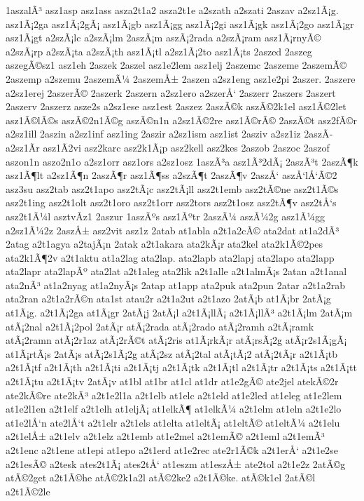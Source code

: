 {1aszalÃ³
asz1asp
asz1ass
asza2t1a2
asza2t1e
a2szath
a2szati
2aszav
a2sz1Ã¡g.
asz1Ã¡2ga
asz1Ã¡2gÃ¡
asz1Ã¡gb
asz1Ã¡gg
asz1Ã¡2gi
asz1Ã¡gk
asz1Ã¡2go
asz1Ã¡gr
asz1Ã¡gt
a2szÃ¡lc
a2szÃ¡lm
2aszÃ¡m
aszÃ¡2rada
a2szÃ¡ram
asz1Ã¡rnyÃ©
a2szÃ¡rp
a2szÃ¡ta
a2szÃ¡th
asz1Ã¡tl
a2sz1Ã¡2to
asz1Ã¡ts
2aszed
2aszeg
aszegÃ©sz1
asz1eh
2aszek
2aszel
asz1e2lem
asz1elj
2aszemc
2aszeme
2aszemÃ©
2aszemp
a2szemu
2aszemÃ¼
2aszemÅ±
2aszen
a2sz1eng
asz1e2pi
2aszer.
2aszere
a2sz1erej
2aszerÃ©
2aszerk
2aszern
a2sz1ero
a2szerÅ‘
2aszerr
2aszers
2aszert
2aszerv
2aszerz
asze2s
a2sz1ese
asz1est
2aszez
2aszÃ©k
aszÃ©2k1el
asz1Ã©2let
asz1Ã©lÃ©s
aszÃ©2n1Ã©g
aszÃ©n1n
a2sz1Ã©2re
asz1Ã©rÃ©
2aszÃ©t
asz2fÃ©r
a2sz1ill
2aszin
a2sz1inf
asz1ing
2aszir
a2sz1ism
asz1ist
2asziv
a2sz1iz
2aszÃ­
a2sz1Ã­r
asz1Ã­2vi
asz2karc
asz2k1Ã¡p
asz2kell
asz2kes
2aszob
2aszoc
2aszof
aszon1n
aszo2n1o
a2sz1orr
asz1ors
a2sz1osz
1aszÃ³a
asz1Ã³2dÃ¡
2aszÃ³t
2aszÃ¶k
asz1Ã¶lt
a2sz1Ã¶n
2aszÃ¶r
asz1Ã¶ss
a2szÃ¶t
2aszÃ¶v
2aszÅ‘
aszÅ‘lÅ‘Ã©2
asz3su
asz2tab
asz2t1apo
asz2tÃ¡c
asz2tÃ¡ll
asz2t1emb
asz2tÃ©ne
asz2t1Ã©s
asz2t1ing
asz2t1olt
asz2t1oro
asz2t1orr
asz2tors
asz2t1osz
asz2tÃ¶v
asz2tÅ‘s
asz2t1Ã¼l
asztvÃ­z1
2aszur
1aszÃºs
asz1Ãºtr
2aszÃ¼
aszÃ¼2g
asz1Ã¼gg
a2sz1Ã¼2z
2aszÅ±
asz2vit
asz1z
2atab
at1abla
a2t1a2cÃ©
ata2dat
at1a2dÃ³
2atag
a2t1agya
a2tajÃ¡n
2atak
a2t1akara
ata2kÃ¡r
ata2kel
ata2k1Ã©2pes
ata2k1Ã¶2v
a2t1aktu
at1a2lag
ata2lap.
ata2lapb
ata2lapj
ata2lapo
ata2lapp
ata2lapr
ata2lapÃº
ata2lat
a2t1aleg
ata2lik
a2t1alle
a2t1almÃ¡s
2atan
a2t1anal
ata2nÃ³
at1a2nyag
at1a2nyÃ¡s
2atap
at1app
ata2puk
ata2pun
2atar
a2t1a2rab
ata2ran
a2t1a2rÃ©n
ata1st
atau2r
a2t1a2ut
a2t1azo
2atÃ¡b
at1Ã¡br
2atÃ¡g
at1Ã¡g.
a2t1Ã¡2ga
at1Ã¡gr
2atÃ¡j
2atÃ¡l
a2t1Ã¡llÃ¡
a2t1Ã¡llÃ³
a2t1Ã¡lm
2atÃ¡m
atÃ¡2nal
a2t1Ã¡2pol
2atÃ¡r
atÃ¡2rada
atÃ¡2rado
atÃ¡2ramh
a2tÃ¡ramk
atÃ¡2ramn
atÃ¡2r1az
atÃ¡2rÃ©t
atÃ¡2ris
at1Ã¡rkÃ¡r
atÃ¡rsÃ¡2g
atÃ¡r2s1Ã¡gÃ¡
at1Ã¡rtÃ¡s
2atÃ¡s
atÃ¡2s1Ã¡2g
atÃ¡2sz
atÃ¡2tal
atÃ¡tÃ¡2
atÃ¡2tÃ¡r
a2t1Ã¡tb
a2t1Ã¡tf
a2t1Ã¡th
a2t1Ã¡ti
a2t1Ã¡tj
a2t1Ã¡tk
a2t1Ã¡tl
a2t1Ã¡tr
a2t1Ã¡ts
a2t1Ã¡tt
a2t1Ã¡tu
a2t1Ã¡tv
2atÃ¡v
at1bl
at1br
at1cl
at1dr
at1e2gÃ©
ate2jel
atekÃ©2r
ate2kÃ©re
ate2kÃ³
a2t1e2l1a
a2t1elb
at1elc
a2t1eld
at1e2led
at1eleg
at1e2lem
at1e2l1en
a2t1elf
a2t1elh
at1eljÃ¡
at1elkÃ¶
at1elkÃ¼
a2t1elm
at1eln
a2t1e2lo
at1e2lÅ‘n
ate2lÅ‘t
a2t1elr
a2t1els
at1elta
at1eltÃ¡
at1eltÃ©
at1eltÃ¼
a2t1elu
a2t1elÅ±
a2t1elv
a2t1elz
a2t1emb
at1e2mel
a2t1emÃ©
a2t1eml
a2t1emÃ³
a2t1enc
a2t1ene
at1epi
at1epo
a2t1erd
at1e2rec
ate2r1Ã©k
a2t1erÅ‘
a2t1e2se
a2t1esÃ©
a2tesk
ates2t1Ã¡
ates2tÅ‘
at1eszm
at1eszÅ±
ate2tol
a2t1e2z
2atÃ©g
atÃ©2get
a2t1Ã©he
atÃ©2k1a2l
atÃ©2ke2
a2t1Ã©ke.
atÃ©k1el
2atÃ©l
a2t1Ã©2le
}
